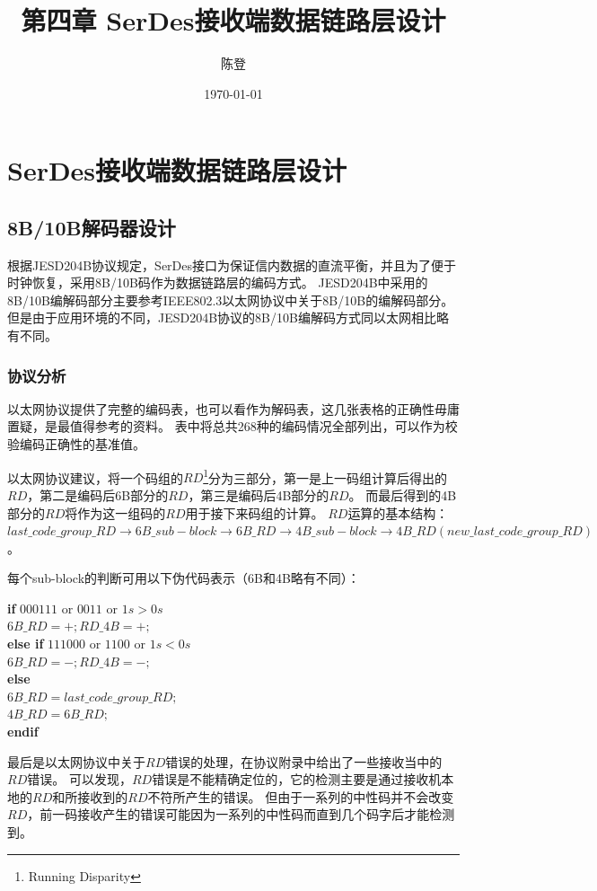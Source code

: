 \documentclass[UTF8]{ctexart}
\title{第四章 SerDes接收端数据链路层设计}
\author{陈登}
\date{\today}
\newcommand\kw{\textbf}
\begin{document}
\section{SerDes接收端数据链路层设计}

\subsection{8B/10B解码器设计}

根据JESD204B协议规定，SerDes接口为保证信内数据的直流平衡，并且为了便于时钟恢复，采用8B/10B码作为数据链路层的编码方式。
JESD204B中采用的8B/10B编解码部分主要参考IEEE802.3以太网协议中关于8B/10B的编解码部分。
但是由于应用环境的不同，JESD204B协议的8B/10B编解码方式同以太网相比略有不同。

\subsubsection{协议分析}

以太网协议提供了完整的编码表，也可以看作为解码表，这几张表格的正确性毋庸置疑，是最值得参考的资料。
表中将总共268种的编码情况全部列出，可以作为校验编码正确性的基准值。

以太网协议建议，将一个码组的$RD$\footnote{Running Disparity}分为三部分，第一是上一码组计算后得出的$RD$，第二是编码后6B部分的$RD$，第三是编码后4B部分的$RD$。
而最后得到的4B部分的$RD$将作为这一组码的$RD$用于接下来码组的计算。
$RD$运算的基本结构：$last\_code\_group\_RD \to 6B\_sub-block \to 6B\_RD \to 4B\_sub-block \to 4B\_RD(new\_last\_code\_group\_RD)$。

每个sub-block的判断可用以下伪代码表示（6B和4B略有不同）：

\begin{tabbing}
\qquad\=\kw{if} $000111$ or $0011$ or $1s>0s$ \\
      \>\qquad$6B\_RD=+;RD\_4B=+;$ \\
      \>\kw{else if} $111000$ or $1100$ or $1s<0s$ \\
      \>\qquad$6B\_RD=-;RD\_4B=-;$ \\
      \>\kw{else} \\
      \>\qquad$6B\_RD=last\_code\_group\_RD;$ \\
      \>\qquad$4B\_RD=6B\_RD;$ \\
      \>\kw{endif}
\end{tabbing}

最后是以太网协议中关于$RD$错误的处理，在协议附录中给出了一些接收当中的$RD$错误。
可以发现，$RD$错误是不能精确定位的，它的检测主要是通过接收机本地的$RD$和所接收到的$RD$不符所产生的错误。
但由于一系列的中性码并不会改变$RD$，前一码接收产生的错误可能因为一系列的中性码而直到几个码字后才能检测到。
\end{document}
